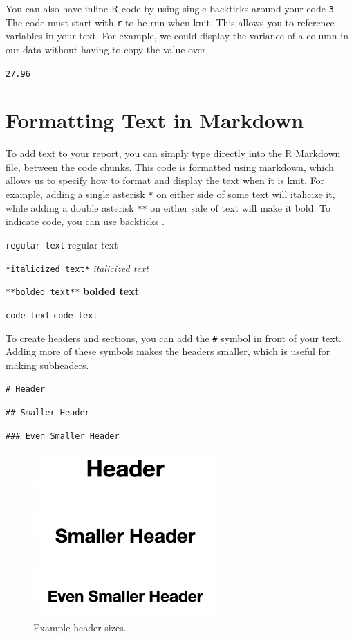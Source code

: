\documentclass[
  letterpaper,
]{krantz}
\begin{document}
You can also have inline R code by using single backticks around your
code \texttt{3}. The code must start with \texttt{r} to be run when
knit. This allows you to reference variables in your text. For example,
we could display the variance of a column in our data without having to
copy the value over.

\texttt{27.96}

\hypertarget{formatting-text-in-markdown}{%
\section{Formatting Text in
Markdown}\label{formatting-text-in-markdown}}

To add text to your report, you can simply type directly into the R
Markdown file, between the code chunks. This code is formatted using
markdown, which allows us to specify how to format and display the text
when it is knit. For example, adding a single asterisk \texttt{*} on
either side of some text will italicize it, while adding a double
asterisk \texttt{**} on either side of text will make it bold. To
indicate code, you can use backticks \texttt{\textasciigrave{}}.

\texttt{regular\ text} regular text

\texttt{*italicized\ text*} \emph{italicized text}

\texttt{**bolded\ text**} \textbf{bolded text}

\texttt{\textasciigrave{}code\ text\textasciigrave{}}
\texttt{code\ text}

To create headers and sections, you can add the \texttt{\#} symbol in
front of your text. Adding more of these symbols makes the headers
smaller, which is useful for making subheaders.

\texttt{\#\ Header}

\texttt{\#\#\ Smaller\ Header}

\texttt{\#\#\#\ Even\ Smaller\ Header}

\begin{figure}

{\centering \includegraphics[width=2.77778in,height=\textheight]{book/images/12-headers.png}

}

\caption{\label{fig-headers}Example header sizes.}

\end{figure}
\end{document}
